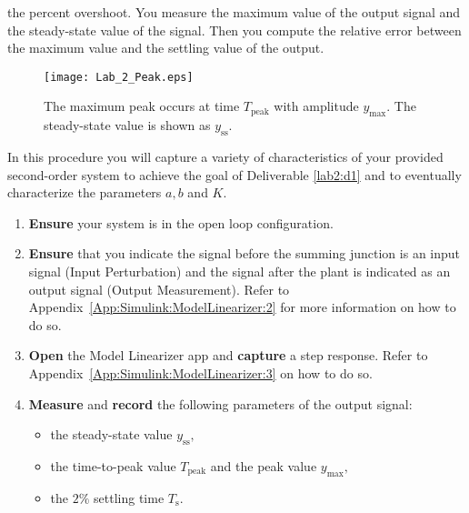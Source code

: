 the percent overshoot. You measure the maximum value of the output
signal and the steady-state value of the signal. Then you
compute the relative error between the maximum value and the settling value of
the output.
%
\begin{figure}
  \texttt{[image: Lab\_2\_Peak.eps]}
  \caption[Depicting Overshoot Measurements for a Second-Order System.]{%
    The maximum peak occurs at time \(T_\mathrm{peak}\) with amplitude
    \(y_\mathrm{max}.\) The steady-state value is shown as \(y_{\mathrm{ss}}.\)
  }
  \label{fig:lab2:peak}
\end{figure}
%
\begin{procedure}[label={proc:lab2:p1}]
  In this procedure you will capture a variety of characteristics of
  your provided second-order system to achieve the goal of Deliverable
  \ref{lab2:d1} and to eventually characterize the parameters \(a,\)\(b\)
  and \(K.\)
  \begin{enumerate}[label=(\arabic*)]
    \item{
      \textbf{Ensure} your system is in the open loop configuration.
    }
    \item{
      \textbf{Ensure} that you indicate the signal before the summing junction
      is an input signal (Input Perturbation) and the signal after the plant
      is indicated as an output signal (Output Measurement). Refer
      to Appendix~\ref{App:Simulink:ModelLinearizer:2} for more information
      on how to do so.
    }
    \item{
      \textbf{Open} the Model Linearizer app and \textbf{capture} a
      step response. Refer to Appendix~\ref{App:Simulink:ModelLinearizer:3}
      on how to do so.
    }
    \item{
      \textbf{Measure} and \textbf{record} the following parameters of the
      output signal:
      \begin{itemize}
        \item{
          the steady-state value \(y_{\mathrm{ss}},\)
        }
        \item{
          the time-to-peak value \(T_{\mathrm{peak}}\) and
          the peak value \(y_{\mathrm{max}},\)
        }
        \item{
          the \(2\%\) settling time \(T_{\mathrm{s}}.\)
        }
      \end{itemize}
      \label{proc:lab2:p1:4}
    }
  \end{enumerate}
\end{procedure}


